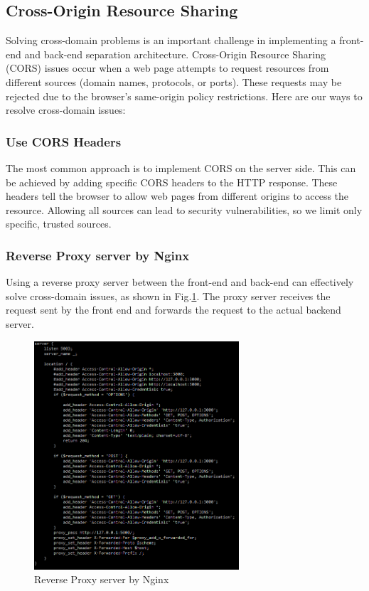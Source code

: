 \documentclass[journal]{IEEEtran}
\begin{document}
\subsection{Cross-Origin Resource Sharing}
Solving cross-domain problems is an important challenge in implementing a front-end and back-end separation architecture. Cross-Origin Resource Sharing (CORS) issues occur when a web page attempts to request resources from different sources (domain names, protocols, or ports). These requests may be rejected due to the browser's same-origin policy restrictions. Here are our ways to resolve cross-domain issues:

\subsubsection{Use CORS Headers}
The most common approach is to implement CORS on the server side. This can be achieved by adding specific CORS headers to the HTTP response. These headers tell the browser to allow web pages from different origins to access the resource. Allowing all sources can lead to security vulnerabilities, so we limit only specific, trusted sources.

\subsubsection{Reverse Proxy server by Nginx}
Using a reverse proxy server between the front-end and back-end can effectively solve cross-domain issues, as shown in Fig.\ref{fig:reversesolution}. The proxy server receives the request sent by the front end and forwards the request to the actual backend server.

\begin{figure}[ht]
  \centering
  \includegraphics[width=3in]{figures/solution-nginx.png}
  \caption{Reverse Proxy server by Nginx}
  \label{fig:reversesolution}
  \end{figure}
\end{document}
